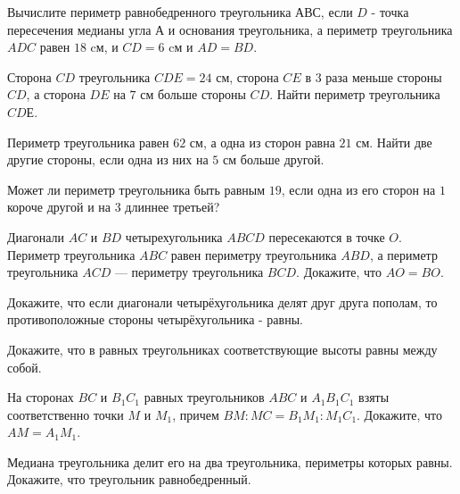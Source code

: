 \begin{class}[number=6]
	\begin{listofex}
		\item Вычислите периметр равнобедренного треугольника \(АВС\), если \(D\) - точка пересечения медианы угла \(А\) и основания треугольника, а периметр треугольника \(ADC\) равен \(18\) cм, и \(CD = 6\) cм и \(AD = BD\).
		\item Сторона \(CD\) треугольника \(CDE = 24\) см, сторона \(CE\) в \(3\) раза меньше стороны  \(CD\), а сторона \(DE\) на \(7\) см больше стороны \(CD\). Найти периметр треугольника  \(CDЕ\).
		\item Периметр треугольника равен \(62\) см, а одна из сторон равна \(21\) см. Найти две другие стороны, если одна из них на \(5\) см больше другой.
		\item Может ли периметр треугольника быть равным \(19\), если одна из его сторон на \(1\) короче другой и на \(3\) длиннее третьей?
		\item Диагонали \(AC\) и \(BD\) четырехугольника \(ABCD\) пересекаются в точке \(O\). Периметр треугольника \(ABC\) равен периметру треугольника \(ABD\), а периметр треугольника \(ACD\) --- периметру треугольника \(BCD\). Докажите, что \(AO = BO\).
		\item Докажите, что если диагонали четырёхугольника делят друг друга пополам, то противоположные стороны четырёхугольника - равны.
		\item Докажите, что в равных треугольниках соответствующие высоты равны между собой.
		\item На сторонах \(BC\) и \(B_1C_1\) равных треугольников \(ABC\) и \(A_1B_1C_1\) взяты соответственно точки \(M\) и \(M_1\), причем \(BM : MC = B_1M_1 : M_1C_1\). Докажите, что \(AM = A_1M_1\).
		\item Медиана треугольника делит его на два треугольника, периметры которых равны. Докажите, что треугольник равнобедренный.
	\end{listofex}
\end{class}
%
%
%
%		
%
%
%	
